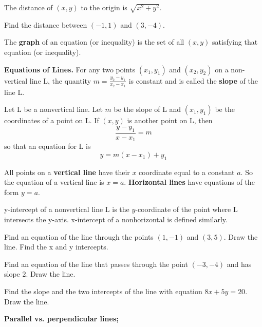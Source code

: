 \documentclass[../main.tex]{subfiles}
\begin{document}
The distance of $(x,y)$ to the origin is $\sqrt{x^2+y^2}$.
\begin{example}
  Find the distance between $(-1, 1)$ and $(3, -4)$.
\end{example}

The \textbf{graph} of an equation (or inequality) is the set of all $(x,y)$ satisfying that equation (or inequality).

\textbf{Equations of Lines.}
For any two points $(x_1, y_1)$ and $(x_2, y_2)$ on a non-vertical line L, the quantity $m=\frac{y_2-y_1}{x_2-x_1}$ is constant and is called the \textbf{slope} of the line L.

Let L be a nonvertical line. Let $m$ be the slope of L and $(x_1, y_1)$ be the coordinates of a point on L. If $(x,y)$ is another point on L, then
\[
  \frac{y-y_1}{x-x_1} = m
\]
so that an equation for L is
\[
  y = m(x-x_1) + y_1
\]

All points on a \textbf{vertical line} have their $x$ coordinate equal to a constant $a$. So the equation of a vertical line is $x=a$. \textbf{Horizontal lines} have equations of the form $y=a$.

y-intercept of a nonvertical line L is the $y$-coordinate of the point where L intersects the y-axis. x-intercept of a nonhorizontal is defined similarly.

\begin{example}
Find an equation of the line through the points $(1,-1)$ and $(3,5)$. Draw the line. Find the x and y intercepts.
\end{example}

\begin{example}
Find an equation of the line that passes through the point $(-3,-4) $ and has slope $2$. Draw the line.
\end{example}

\begin{example}
Find the slope and the two intercepts of the line with equation $8x+5y=20$. Draw the line.
\end{example}

\textbf{Parallel vs. perpendicular lines;}
\end{document}
